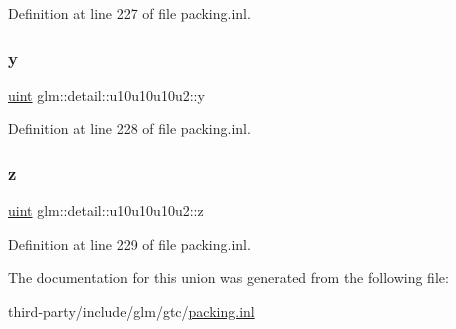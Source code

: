Definition at line 227 of file packing.\+inl.

\mbox{\label{unionglm_1_1detail_1_1u10u10u10u2_a7eb44cac4892d2587f8b5f67681f8e85}} 
\subsubsection{\texorpdfstring{y}{y}}
{\footnotesize\ttfamily \hyperlink{group__core__precision_ga4fd29415871152bfb5abd588334147c8}{uint} glm\+::detail\+::u10u10u10u2\+::y}



Definition at line 228 of file packing.\+inl.

\mbox{\label{unionglm_1_1detail_1_1u10u10u10u2_a8c4c851343129c55d86d6b0b7aed9b4f}} 
\subsubsection{\texorpdfstring{z}{z}}
{\footnotesize\ttfamily \hyperlink{group__core__precision_ga4fd29415871152bfb5abd588334147c8}{uint} glm\+::detail\+::u10u10u10u2\+::z}



Definition at line 229 of file packing.\+inl.



The documentation for this union was generated from the following file\+:\begin{DoxyCompactItemize}
\item 
third-\/party/include/glm/gtc/\hyperlink{packing_8inl}{packing.\+inl}\end{DoxyCompactItemize}
